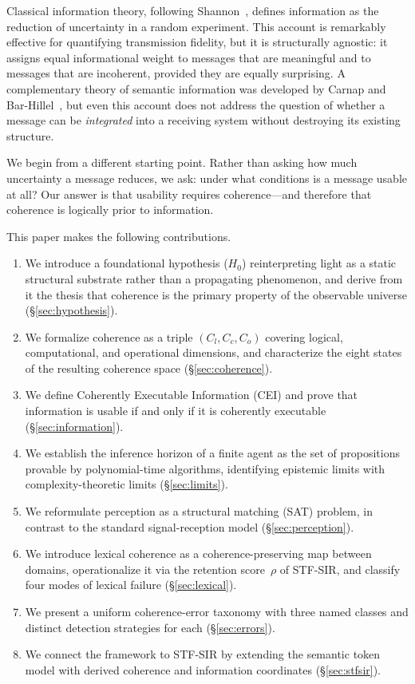 \documentclass{article}
\newcommand{\STF}{{\normalfont\textsc{STF}}}
\newcommand{\SIR}{{\normalfont\textsc{SIR}}}
\begin{document}
Classical information theory, following Shannon~\cite{shannon1948}, defines
information as the reduction of uncertainty in a random experiment.  This
account is remarkably effective for quantifying transmission fidelity, but it is
structurally agnostic: it assigns equal informational weight to messages that are
meaningful and to messages that are incoherent, provided they are equally
surprising.  A complementary theory of semantic information was developed by
Carnap and Bar-Hillel~\cite{carnap1953}, but even this account does not address
the question of whether a message can be \emph{integrated} into a receiving
system without destroying its existing structure.

We begin from a different starting point.  Rather than asking how much
uncertainty a message reduces, we ask: under what conditions is a message usable
at all?  Our answer is that usability requires coherence---and therefore that
coherence is logically prior to information.

This paper makes the following contributions.
\begin{enumerate}
  \item We introduce a foundational hypothesis ($H_0$) reinterpreting light as a
        static structural substrate rather than a propagating phenomenon, and
        derive from it the thesis that coherence is the primary property of the
        observable universe (\S\ref{sec:hypothesis}).
  \item We formalize coherence as a triple $(C_l, C_c, C_o)$ covering logical,
        computational, and operational dimensions, and characterize the eight
        states of the resulting coherence space (\S\ref{sec:coherence}).
  \item We define Coherently Executable Information (CEI) and prove that
        information is usable if and only if it is coherently executable
        (\S\ref{sec:information}).
  \item We establish the inference horizon of a finite agent as the set of
        propositions provable by polynomial-time algorithms, identifying
        epistemic limits with complexity-theoretic limits (\S\ref{sec:limits}).
  \item We reformulate perception as a structural matching (SAT) problem, in
        contrast to the standard signal-reception model (\S\ref{sec:perception}).
  \item We introduce lexical coherence as a coherence-preserving map between
        domains, operationalize it via the retention score~$\rho$ of \STF{}-\SIR{},
        and classify four modes of lexical failure (\S\ref{sec:lexical}).
  \item We present a uniform coherence-error taxonomy with three named classes
        and distinct detection strategies for each (\S\ref{sec:errors}).
  \item We connect the framework to \STF{}-\SIR{} by extending the semantic
        token model with derived coherence and information coordinates
        (\S\ref{sec:stfsir}).
\end{enumerate}
\end{document}
